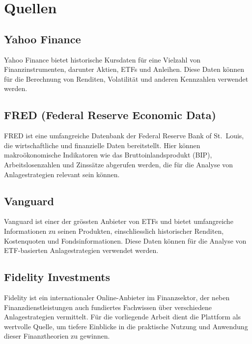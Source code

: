 \documentclass[
  ngerman,
  a4paper,
  DIV=11,
  oneside]{scrreprt}
\begin{document}
\section{Quellen}\label{quellen}

\subsection{Yahoo Finance}\label{yahoo-finance}

Yahoo Finance bietet historische Kursdaten für eine Vielzahl von
Finanzinstrumenten, darunter Aktien, ETFs und Anleihen. Diese Daten
können für die Berechnung von Renditen, Volatilität und anderen
Kennzahlen verwendet werden.

\subsection{FRED (Federal Reserve Economic
Data)}\label{fred-federal-reserve-economic-data}

FRED ist eine umfangreiche Datenbank der Federal Reserve Bank of
St.~Louis, die wirtschaftliche und finanzielle Daten bereitstellt. Hier
können makroökonomische Indikatoren wie das Bruttoinlandsprodukt (BIP),
Arbeitslosenzahlen und Zinssätze abgerufen werden, die für die Analyse
von Anlagestrategien relevant sein können.

\subsection{Vanguard}\label{vanguard}

Vanguard ist einer der grössten Anbieter von ETFs und bietet
umfangreiche Informationen zu seinen Produkten, einschliesslich
historischer Renditen, Kostenquoten und Fondsinformationen. Diese Daten
können für die Analyse von ETF-basierten Anlagestrategien verwendet
werden.

\subsection{Fidelity Investments}\label{fidelity-investments}

Fidelity ist ein internationaler Online-Anbieter im Finanzsektor, der
neben Finanzdienstleistungen auch fundiertes Fachwissen über
verschiedene Anlagestrategien vermittelt. Für die vorliegende Arbeit
dient die Plattform als wertvolle Quelle, um tiefere Einblicke in die
praktische Nutzung und Anwendung dieser Finanztheorien zu gewinnen.
\end{document}
